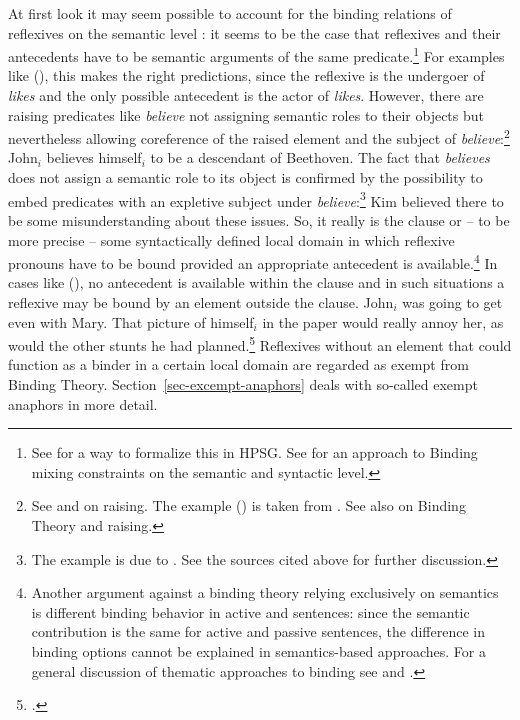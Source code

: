 \documentclass[output=paper
	        ,collection
	        ,collectionchapter
 	        ,biblatex
                ,babelshorthands
                ,newtxmath
                ,draftmode
                ,colorlinks, citecolor=brown
]{langscibook}
\begin{document}
At first look it may seem possible to account for the binding relations of reflexives on the
semantic level \citep{BP80a}: it seems to be the case that reflexives and their antecedents have to be semantic
arguments of the same predicate.\footnote{%
  See \citet{Riezler95a} for a way to formalize this in HPSG. See  for an approach to
  Binding mixing constraints on the semantic and syntactic level.%
} For examples like (), this makes the right predictions,
since the reflexive is the undergoer of \emph{likes} and the only possible antecedent is the actor of
\emph{likes}. However, there are raising predicates like \emph{believe} not assigning semantic roles
to their objects but nevertheless allowing coreference of the raised element and the subject of
\emph{believe}:\footnote{%
 See \citealp[Chapter~3.5]{ps2} and  on raising. The example
 () is taken from . See also  on Binding
 Theory and raising.%
}
\ea
John$_i$ believes himself$_i$ to be a descendant of Beethoven.
\z
The fact that \emph{believes} does not assign a semantic role to its object is confirmed by the
possibility to embed predicates with an expletive subject under \emph{believe}:\footnote{%
The example is due to \citet[]{ps2}. See the sources cited above for further discussion.
}
\ea
Kim believed there to be some misunderstanding about these issues.
\z
So, it really is the clause or -- to be more precise -- some syntactically defined local domain in
which reflexive pronouns have to be bound provided an appropriate antecedent is available.\footnote{%
Another argument against a binding theory relying exclusively on semantics is different binding
behavior in active and  sentences: since the semantic contribution is the same for active
and passive sentences, the difference in binding options cannot be explained in semantics-based
approaches. 
For a general discussion of
thematic approaches to binding see  and .
}
In cases like (), no antecedent is available within the clause and in such situations a
reflexive may be bound by an element outside the clause.
\ea
John$_i$ was going to get even with Mary. That picture of himself$_i$
in the paper would really annoy her, as would the other stunts he had planned.\footnote{
        .
}
\z
Reflexives without an element that could function as a binder in a certain local domain are regarded
as exempt from Binding Theory. Section~\ref{sec-excempt-anaphors} deals with so-called exempt anaphors in more detail.
\end{document}
